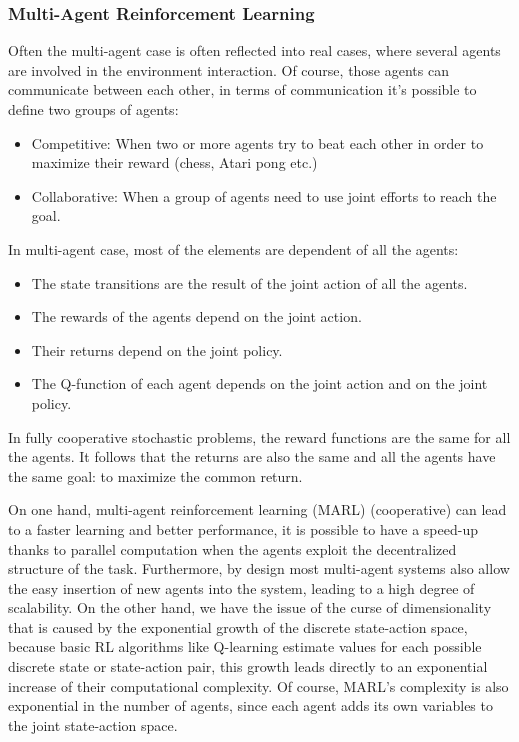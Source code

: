 \documentclass[12pt]{article}
\begin{document}
\subsubsection{Multi-Agent Reinforcement Learning}
Often the multi-agent case is often reflected into real cases, where several agents are involved in the environment interaction. Of course, those agents can communicate between each other, in terms of communication it's possible to define two groups of agents:
\begin{itemize}
    \item Competitive: When two or more agents try to beat each other in order to maximize their reward (chess, Atari pong etc.)
    \item Collaborative: When a group of agents need to use joint efforts to reach the goal.
\end{itemize}

In multi-agent case, most of the elements are dependent of all the agents:
\begin{itemize}
    \item The state transitions are the result of the joint action of all the agents.
    \item The rewards of the agents depend on the joint action.
    \item Their returns depend on the joint policy.
    \item The Q-function of each agent depends on the joint action and on the joint policy.
\end{itemize}

In fully cooperative stochastic problems, the reward functions are the same for all the agents. It follows that the returns are also the same and all the agents have the same goal: to maximize the common return.

On one hand, multi-agent reinforcement learning (MARL) (cooperative) can lead to a faster learning and better performance, it is possible to have a speed-up thanks to parallel computation when the agents exploit the decentralized structure of the task. Furthermore, by design most multi-agent systems also allow the easy insertion of new agents into the system, leading to a high degree of scalability. On the other hand, we have the issue of the curse of dimensionality that is caused by the exponential growth of the discrete state-action space, because basic RL algorithms like Q-learning estimate values for each possible discrete state or state-action pair, this growth leads directly to an exponential increase of their computational complexity. Of course, MARL's complexity is also exponential in the number of agents, since each agent adds its own variables to the joint state-action space. 
\end{document}
